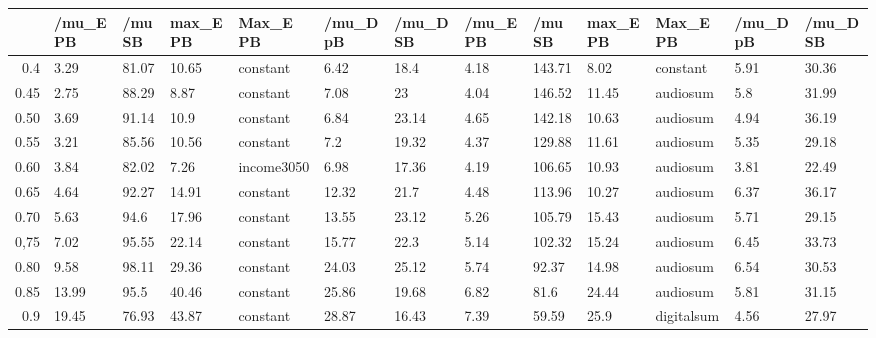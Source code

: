 \begin{table}[ht]
\centering
\begin{tabular}{rllllllllllll}
  \hline
 & /mu\_E PB & /mu SB & max\_E PB & Max\_E PB & /mu\_D pB & /mu\_D SB & /mu\_E PB & /mu SB & max\_E PB & Max\_E PB & /mu\_D pB & /mu\_D SB \\ 
  \hline
0.4 & 3.29 & 81.07 & 10.65 & constant & 6.42 & 18.4 & 4.18 & 143.71 & 8.02 & constant & 5.91 & 30.36 \\ 
  0.45 & 2.75 & 88.29 & 8.87 & constant & 7.08 & 23 & 4.04 & 146.52 & 11.45 & audiosum & 5.8 & 31.99 \\ 
  0.50 & 3.69 & 91.14 & 10.9 & constant & 6.84 & 23.14 & 4.65 & 142.18 & 10.63 & audiosum & 4.94 & 36.19 \\ 
  0.55 & 3.21 & 85.56 & 10.56 & constant & 7.2 & 19.32 & 4.37 & 129.88 & 11.61 & audiosum & 5.35 & 29.18 \\ 
  0.60 & 3.84 & 82.02 & 7.26 & income3050 & 6.98 & 17.36 & 4.19 & 106.65 & 10.93 & audiosum & 3.81 & 22.49 \\ 
  0.65 & 4.64 & 92.27 & 14.91 & constant & 12.32 & 21.7 & 4.48 & 113.96 & 10.27 & audiosum & 6.37 & 36.17 \\ 
  0.70 & 5.63 & 94.6 & 17.96 & constant & 13.55 & 23.12 & 5.26 & 105.79 & 15.43 & audiosum & 5.71 & 29.15 \\ 
  0,75 & 7.02 & 95.55 & 22.14 & constant & 15.77 & 22.3 & 5.14 & 102.32 & 15.24 & audiosum & 6.45 & 33.73 \\ 
  0.80 & 9.58 & 98.11 & 29.36 & constant & 24.03 & 25.12 & 5.74 & 92.37 & 14.98 & audiosum & 6.54 & 30.53 \\ 
  0.85 & 13.99 & 95.5 & 40.46 & constant & 25.86 & 19.68 & 6.82 & 81.6 & 24.44 & audiosum & 5.81 & 31.15 \\ 
  0.9 & 19.45 & 76.93 & 43.87 & constant & 28.87 & 16.43 & 7.39 & 59.59 & 25.9 & digitalsum & 4.56 & 27.97 \\ 
   \hline
\end{tabular}
\end{table}
